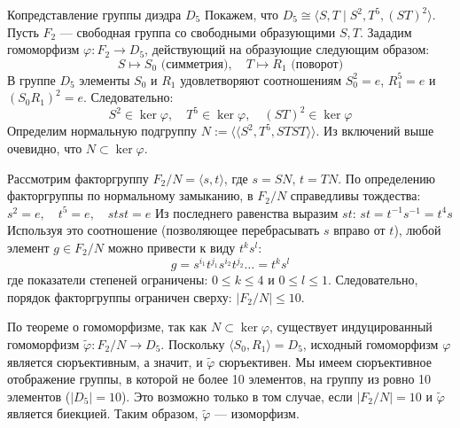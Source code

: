 \begin{Example}{Копредставление группы диэдра $D_5$}{}
	Покажем, что $D_5 \cong \langle S, T \mid S^2, T^5, (ST)^2 \rangle$.
	Пусть $F_2$ — свободная группа со свободными образующими $S, T$. Зададим гомоморфизм $\varphi: F_2 \to D_5$, действующий на образующие следующим образом:
	\[ S \mapsto S_0 \text{ (симметрия)}, \quad T \mapsto R_1 \text{ (поворот)} \]
	В группе $D_5$ элементы $S_0$ и $R_1$ удовлетворяют соотношениям $S_0^2 = e$, $R_1^5 = e$ и $(S_0 R_1)^2 = e$.
	Следовательно:
	\[ S^2 \in \ker \varphi, \quad T^5 \in \ker \varphi, \quad (ST)^2 \in \ker \varphi \]
	Определим нормальную подгруппу $N := \langle\langle S^2, T^5, STST \rangle\rangle$.
	Из включений выше очевидно, что $N \subset \ker \varphi$.

	Рассмотрим факторгруппу $F_2 / N = \langle s, t \rangle$, где $s = SN$, $t = TN$. По определению факторгруппы по нормальному замыканию, в $F_2/N$ справедливы тождества: $ s^2 = e, \quad t^5 = e, \quad stst = e $
	Из последнего равенства выразим $st$: $st = t^{-1}s^{-1} = t^4 s $
	Используя это соотношение (позволяющее перебрасывать $s$ вправо от $t$), любой элемент $g \in F_2 / N$ можно привести к виду $t^k s^l$:
	\[ g = s^{i_1} t^{j_1} s^{i_2} t^{j_2} \dots = t^k s^l \]
	где показатели степеней ограничены: $0 \le k \le 4$ и $0 \le l \le 1$. Следовательно, порядок факторгруппы ограничен сверху: $|F_2 / N| \le 10$.

	По теореме о гомоморфизме, так как $N \subset \ker \varphi$, существует индуцированный гомоморфизм $\widetilde{\varphi}: F_2 / N \to D_5$.
	Поскольку $\langle S_0, R_1 \rangle = D_5$, исходный гомоморфизм $\varphi$ является сюръективным, а значит, и $\widetilde{\varphi}$ сюръективен. Мы имеем сюръективное отображение группы, в которой не более 10 элементов, на группу из ровно 10 элементов ($|D_5| = 10$). Это возможно только в том случае, если $|F_2 / N| = 10$ и $\widetilde{\varphi}$ является биекцией. Таким образом, $\widetilde{\varphi}$ — изоморфизм.
\end{Example}

